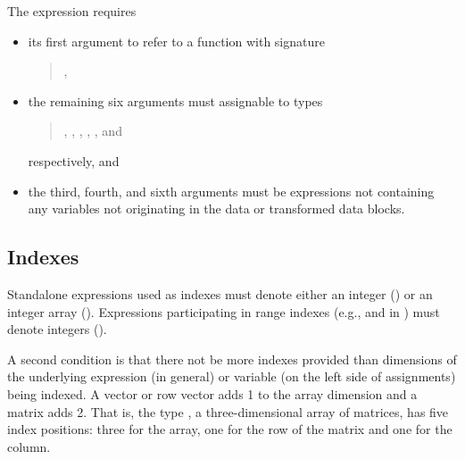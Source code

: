 The  expression requires
%
\begin{itemize}
\item its first argument to refer to a function with signature
\begin{quote}
 ,
\end{quote}
\item the remaining six arguments must assignable to types
\begin{quote}
  , , , ,
, and 
\end{quote}
 respectively, and
\item the third, fourth, and sixth arguments must be expressions not
  containing any variables not originating in the data or transformed
  data blocks.
\end{itemize}

\subsection{Indexes}

Standalone expressions used as indexes must denote either an integer
() or an integer array ().  Expressions
participating in range indexes (e.g.,  and  in
) must denote integers ().

A second condition is that there not be more indexes provided than
dimensions of the underlying expression (in general) or variable (on
the left side of assignments) being indexed.  A vector or row vector
adds 1 to the array dimension and a matrix adds 2.  That is, the type
, a three-dimensional array of matrices, has five
index positions: three for the array, one for the row of the matrix
and one for the column.
